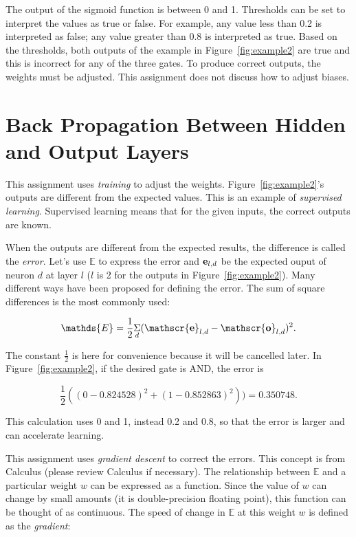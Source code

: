 The output of the sigmoid function is between 0 and 1.  Thresholds can
be set to interpret the values as true or false.  For example, any
value less than 0.2 is interpreted as false; any value greater than
0.8 is interpreted as true.  Based on the thresholds, both outputs of
the example in Figure~\ref{fig:example2} are true and this is
incorrect for any of the three gates.  To produce correct outputs, the
weights must be adjusted.  This assignment does not discuss how to
adjust biases.

\section{Back Propagation Between Hidden and Output Layers}

This assignment uses {\it training} to adjust the weights.
Figure~\ref{fig:example2}'s outputs are different from the expected
values.  This is an example of {\it supervised learning}.  Supervised
learning means that for the given inputs, the correct outputs are
known.

When the outputs are different from the expected results, the
difference is called the {\it error}.  Let's use $\mathds{E}$ to
express the error and $\mathscr {\bf e}_{l, d}$ be the expected ouput
of neuron $d$ at layer $l$ ($l$ is 2 for the outputs in
Figure~\ref{fig:example2}).  Many different ways have been proposed
for defining the error. The sum of square differences is the most
commonly used:

\begin{equation}
\mathds{E} =
\frac{1}{2} \underset{d}{ \Sigma} (\mathscr {\bf e}_{l, d}
- \mathscr {\bf o}_{l, d})^2.
\label{eqn:error}
\end{equation}

The constant $\frac{1}{2}$ is here for convenience because it will be
cancelled later.  In Figure~\ref{fig:example2}, if the desired gate is
AND, the error is

\begin{equation}
\frac{1}{2} ((0 -  0.824528) ^ 2 + (1 - 0.852863)^2)) = 0.350748.
\end{equation}

This calculation uses 0 and 1, instead 0.2 and 0.8, so that the error
is larger and can accelerate learning.

This assignment uses {\it gradient descent} to correct the errors.
This concept is from Calculus (please review Calculus if necessary).
The relationship between $\mathds{E}$ and a particular weight $w$ can
be expressed as a function.  Since the value of $w$ can change by
small amounts (it is double-precision floating point), this function
can be thought of as continuous.  The speed of change in $\mathds{E}$
at this weight $w$ is defined as the {\it gradient}:

